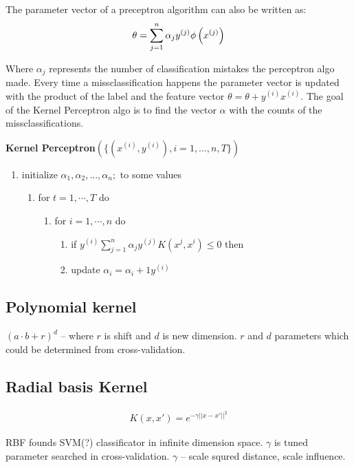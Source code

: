 The parameter vector of a preceptron algorithm can also be written as: 
\begin{align*}
\displaystyle  \displaystyle \theta = \sum _{j=1}^{n} \alpha _ j y^{(j)} \phi \left(x^{(j)}\right)
\end{align*}

Where $\alpha_j$ represents the number of classification mistakes the perceptron algo made. Every time a missclassification happens the parameter vector is updated with the product of the label and the feature vector $\theta  = \theta + y^{(i)} x^{(i)}$. The goal of the Kernel Perceptron algo is to find the vector $\alpha$ with the counts of the missclassifications.

\textbf{Kernel Perceptron}$\displaystyle \left(\big \{ (x^{(i)}, y^{(i)}), i=1,...,n, T \big \} \right)$
\begin{enumerate}[\indent {}]
	\item initialize  $\alpha _1, \alpha _2, ..., \alpha _ n;$ to some values
	\begin{enumerate}[\indent {}]
		\item for $t=1,\cdots,T$ do
		\begin{enumerate}[\indent {}]
			\item for $i=1,\cdots,n$ do
			\begin{enumerate}[\indent {}]
				\item if $y^{(i)}\sum _{j=1}^{n} \alpha _ j y^{(j)} K(x^{j},x^{i}) \leq 0$ then
				\item update $\alpha _ i = \alpha _ i +1 y^{(i)}$
			\end{enumerate}
		\end{enumerate}
	\end{enumerate}
\end{enumerate}

\subsection{Polynomial kernel}
$(a \cdot b+r)^d$ -- where $r$ is shift and $d$ is new dimension. $r$ and $d$ parameters which
could be determined from cross-validation.

\subsection{Radial basis Kernel}
\begin{align*}
K(x,x') = e^{-\gamma {||x-x'||}^2}
\end{align*}

RBF founds SVM(?) classificator in infinite dimension space. 
$\gamma$ is tuned parameter searched in cross-validation.
$\gamma$ -- scale squred distance, scale influence.
